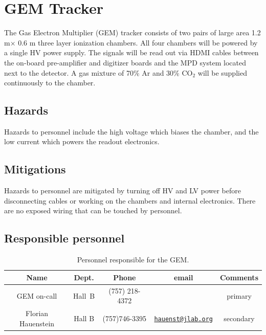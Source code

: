 \section{GEM Tracker}
The Gas Electron Multiplier (GEM) tracker consists of two pairs of large area 1.2 m× 0.6
m three layer ionization chambers. All four chambers will be powered by a single HV power
supply. The signals will be read out via HDMI cables between the on-board pre-amplifier
and digitizer boards and the MPD system located next to the detector. A gas mixture of
70\% Ar and 30\% CO$_2$ will be supplied continuously to the chamber.
\subsection{Hazards}
Hazards to personnel include the high voltage which biases the chamber, and the
low current which powers the readout electronics.
\subsection{Mitigations}
Hazards to personnel are mitigated by turning off HV and LV power before disconnecting cables or working on the chambers and internal electronics.
There are no exposed wiring that can be touched by personnel.
\subsection{Responsible personnel}

\begin{table}[!htb]
\centering
\begin{tabular}{|c|c|c|c|c|} \hline
Name&Dept.&Phone&email&Comments \\ \hline
GEM on-call & Hall~B& (757) 218-4372&& primary  \\ \hline
Florian Hauenstein & Hall B  &(757)746-3395 &\href{mailto:hauenst@jlab.org}{\nolinkurl{hauenst@jlab.org}}  & secondary \\ \hline
 \end{tabular}
\caption{Personnel responsible for the GEM.} 
\label{tb:vacuum}
\end{table}
